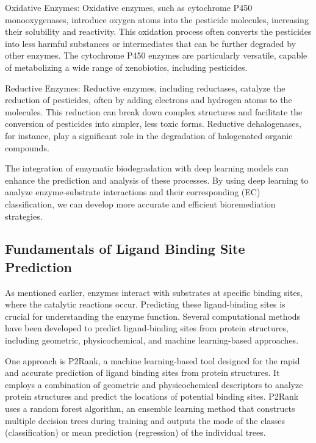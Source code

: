 Oxidative Enzymes: Oxidative enzymes, such as cytochrome P450 monooxygenases, introduce oxygen atoms into the pesticide molecules, increasing their solubility and reactivity. This oxidation process often converts the pesticides into less harmful substances or intermediates that can be further degraded by other enzymes. The cytochrome P450 enzymes are particularly versatile, capable of metabolizing a wide range of xenobiotics, including pesticides. \autocite{belloTheoreticalApproachMechanism2000}

Reductive Enzymes: Reductive enzymes, including reductases, catalyze the reduction of pesticides, often by adding electrons and hydrogen atoms to the molecules. This reduction can break down complex structures and facilitate the conversion of pesticides into simpler, less toxic forms. Reductive dehalogenases, for instance, play a significant role in the degradation of halogenated organic compounds.

The integration of enzymatic biodegradation with deep learning models can enhance the prediction and analysis of these processes. By using deep learning to analyze enzyme-substrate interactions and their corresponding (EC) classification, we can develop more accurate and efficient bioremediation strategies.

\subsection{Fundamentals of Ligand Binding Site Prediction}
\label{sec:Fundamentals of Ligand Binding Site Prediction}

As mentioned earlier, enzymes interact with substrates at specific binding sites, where the catalytic reactions occur. Predicting these ligand-binding sites is crucial for understanding the enzyme function. Several computational methods have been developed to predict ligand-binding sites from protein structures, including geometric, physicochemical, and machine learning-based approaches.

One approach is P2Rank, a machine learning-based tool designed for the rapid and accurate prediction of ligand binding sites from protein structures. It employs a combination of geometric and physicochemical descriptors to analyze protein structures and predict the locations of potential binding sites. P2Rank uses a random forest algorithm, an ensemble learning method that constructs multiple decision trees during training and outputs the mode of the classes (classification) or mean prediction (regression) of the individual trees.

